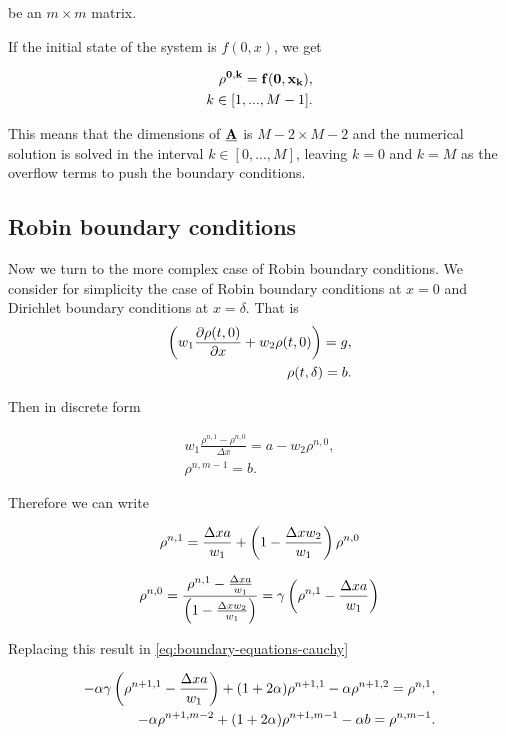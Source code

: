 be an $m\times m$ matrix.

If the initial state of the system is $f(0,x)$, we get

\begin{align}
    \bf{\rho^{0,k}} = f(0, x_k), \\
    k \in [1,..., M-1].
\end{align}

This means that the dimensions of $\bf{\underline{A}}$ is $M-2 \times M-2$ and the numerical solution is solved in the interval  $k \in [0,..., M]$, leaving $k=0$ and $k=M$ as the overflow terms to push the boundary conditions.




\subsection{Robin boundary conditions}

Now we turn to the more complex case of Robin boundary conditions. We consider for simplicity the case of Robin boundary conditions at $x=0$ and Dirichlet boundary conditions at $x = \delta$. That is
\begin{align}
	\left({w_1\frac{\partial \rho(t,0)}{\partial x}+w_2\rho(t,0)}\right) = g,\\
	\rho(t,\delta) = b.
\end{align}

Then in discrete form 

\begin{align}
    w_1\frac{\rho^{n, 1}-\rho^{n,0}}{\Delta x} = a - w_2\rho^{n, 0}, \\
    \rho^{n, m-1} = b.
\end{align}

Therefore we can write

\begin{align}
	\rho^{n,1} = \frac{\Delta x a }{w_1} + \left({1 - \frac{\Delta x w_2 }{w_1}}\right)\rho^{n, 0}\\
\end{align}

\begin{align}
	\rho^{n, 0} = \frac{\rho^{n,1} - \frac{\Delta x a }{w_1}}{\left({1 - \frac{\Delta x w_2 }{w_1}}\right)} = \gamma\left({\rho^{n,1} - \frac{\Delta x a }{w_1}}\right) \\
\end{align}

Replacing this result in \ref{eq:boundary-equations-cauchy} 

\begin{align}
	\label{eq:boundary-equations-robin}
    -\alpha \gamma \left({\rho^{n+1, 1} - \frac{\Delta x a }{w_1}}\right)  + ( 1 + 2\alpha ) \rho^{n+1,1} -\alpha \rho^{n+1,2} = \rho^{n,1},\\
    -\alpha \rho^{n+1,m-2} + ( 1 + 2\alpha ) \rho^{n+1,m-1} - \alpha b = \rho^{n,m-1}.
\end{align}

